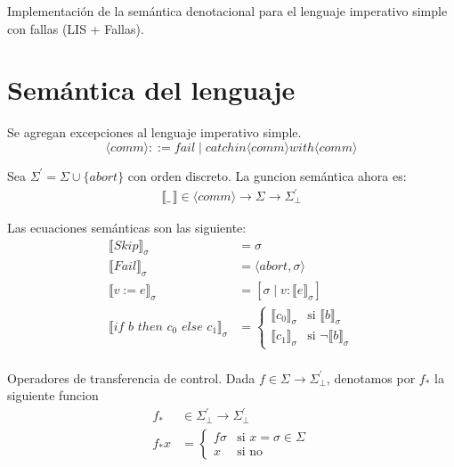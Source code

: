 \documentclass[12pt,a4paper]{article}
\begin{document}
\maketitle{}

Implementación de la semántica denotacional para el lenguaje imperativo simple 
con fallas (LIS + Fallas).

\section{Semántica del lenguaje}
Se agregan excepciones al lenguaje imperativo simple.
$$\langle comm \rangle ::= fail \mid catchin \langle comm \rangle with \langle comm \rangle$$

Sea $\Sigma^{'} = \Sigma \cup \{ abort\}$ con orden discreto. La guncion semántica ahora es:
\begin{align*}
\llbracket\_\,\rrbracket \in \langle comm \rangle \to \Sigma \to \Sigma^{'}_{\bot}
\end{align*}

Las ecuaciones semánticas son las siguiente:
\begin{align*}
\llbracket Skip \rrbracket_{\sigma} & = \sigma \\
\llbracket Fail\rrbracket_{\sigma} &= \langle abort, \sigma \rangle\\
\llbracket v := e\rrbracket_{\sigma} &= [\sigma\mid v : \llbracket e\rrbracket_{\sigma} ]\\
\llbracket if\,\, b\,\, then\,\, c_{0}\,\, else\,\, c_{1} \rrbracket_{\sigma} &= \begin{cases}
  \llbracket c_{0}\rrbracket_{\sigma} & \text{si}\,\, \llbracket b\rrbracket_{\sigma}\\
  \llbracket c_{1}\rrbracket_{\sigma} & \text{si}\,\, \neg \llbracket b\rrbracket_{\sigma}
\end{cases}\\
\end{align*}


Operadores de transferencia de control. Dada $f \in \Sigma \to \Sigma^{'}_{\bot}$,
denotamos por $f_{*}$ la siguiente funcion
\begin{align*}
f_{*} & \in \Sigma^{'}_{\bot} \to \Sigma^{'}_{\bot}\\
f_{*}x &= \begin{cases}
  f \sigma & \text{si}\,\, x = \sigma \in \Sigma\\
  x & \text{si no}
\end{cases}
\end{align*}
\end{document}
